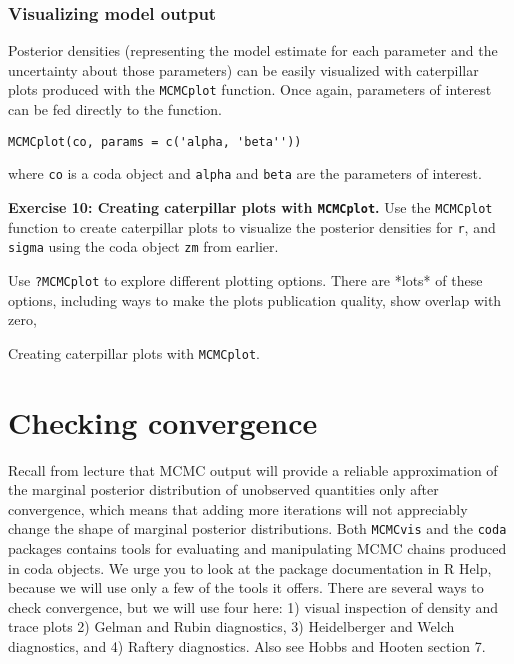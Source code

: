 \documentclass[12pt,english]{article}
\begin{document}
\subsubsection{Visualizing model output}

Posterior densities (representing the model estimate for each parameter and the uncertainty about those parameters) can be easily visualized with caterpillar plots produced with the \texttt{MCMCplot} function. Once again, parameters of interest can be fed directly to the function.

\begin{Verbatim}
MCMCplot(co, params = c('alpha, 'beta''))
\end{Verbatim}

\noindent where \texttt{co} is a coda object and \texttt{alpha} and \texttt{beta} are the parameters of interest.



\bigskip
\belowcaptionskip=-40pt
\begin{exercise}
\begin{mdframed}
\doublespacing
\textbf{Exercise 10: Creating caterpillar plots with \texttt{MCMCplot}.} Use the \texttt{MCMCplot} function to create caterpillar plots to visualize the posterior densities for \texttt{r}, and \texttt{sigma} using the coda object \texttt{zm} from earlier. 

Use \texttt{?MCMCplot} to explore different plotting options.  There are *lots* of these options, including ways to make the plots publication quality, show overlap with zero, 
\end{mdframed}
\captionsetup{textformat=empty, labelformat=empty}
\caption[Creating caterpillar plots with \texttt{MCMCplot}]{Creating caterpillar plots with \texttt{MCMCplot}.}
\label{ex:caterpillar plots MCMCplot}
\end{exercise}
\belowcaptionskip=0pt


\section{Checking convergence}

Recall from lecture that MCMC output will provide a reliable approximation of the marginal posterior distribution of unobserved quantities only after convergence, which means that adding more iterations will not appreciably change the shape of  marginal posterior distributions. Both \texttt{MCMCvis} and the \texttt{coda} packages contains tools for evaluating and manipulating MCMC chains produced in coda objects. We urge you to look at the package documentation in R Help, because we will use only a few of the tools it offers. There are several ways to check convergence, but we will use four here: 1) visual inspection of density and trace plots 2) Gelman and Rubin diagnostics, 3) Heidelberger and Welch diagnostics, and 4) Raftery diagnostics. Also see Hobbs and Hooten \citeyearpar{hobbs2015bayesian} section 7.
\end{document}
